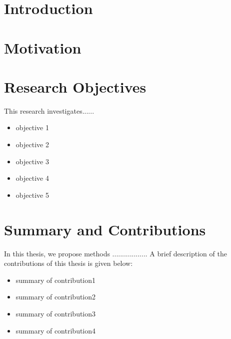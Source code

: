 \documentclass[12pt,a4paper,oneside]{report}
\begin{document}
\section{Introduction}
\lipsum[2-4]\cite{shaoo2020}







\section{Motivation}
\lipsum[2-4]


\section{Research Objectives}
This research investigates......
\begin{itemize}
  \item objective 1
  \item objective 2
  \item objective 3
  \item objective 4
  \item  objective 5 
  
\end{itemize}





\section{Summary and Contributions}
In this thesis, we propose methods .................. A brief description of the contributions of this thesis is given below:
\begin{itemize}
    \item summary of contribution1
    
    \item summary of contribution2
    
    \item summary of contribution3
    
    \item summary of contribution4
\end{itemize}
\end{document}
